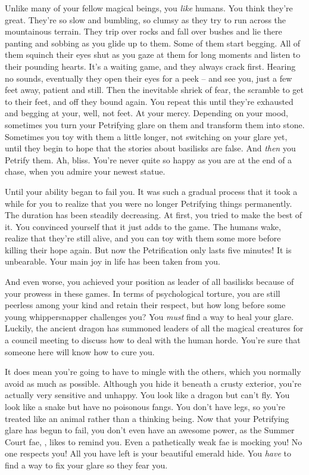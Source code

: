 \documentclass[char]{guildcamp2}
\begin{document}
\name{\cBasilisk{}}

Unlike many of your fellow magical beings, you \emph{like} humans.  You think they're great.  They're so slow and bumbling, so clumsy as they try to run across the mountainous terrain.  They trip over rocks and fall over bushes and lie there panting and sobbing as you glide up to them.  Some of them start begging.  All of them squinch their eyes shut as you gaze at them for long moments and listen to their pounding hearts.  It's a waiting game, and they always crack first.  Hearing no sounds, eventually they open their eyes for a peek -- and see you, just a few feet away, patient and still.  Then the inevitable shriek of fear, the scramble to get to their feet, and off they bound again.  You repeat this until they're exhausted and begging at your, well, not feet.  At your mercy.  Depending on your mood, sometimes you turn your Petrifying glare on them and transform them into stone.  Sometimes you toy with them a little longer, not switching on your glare yet, until they begin to hope that the stories about basilisks are false.  And \emph{then} you Petrify them.  Ah, bliss.  You're never quite so happy as you are at the end of a chase, when you admire your newest statue.

Until your ability began to fail you.  It was such a gradual process that it took a while for you to realize that you were no longer Petrifying things permanently.  The duration has been steadily decreasing.  At first, you tried to make the best of it.  You convinced yourself that it just adds to the game.  The humans wake, realize that they're still alive, and you can toy with them some more before killing their hope again.  But now the Petrification only lasts five minutes!  It is unbearable.  Your main joy in life has been taken from you.  

And even worse, you achieved your position as leader of all basilisks because of your prowess in these games.  In terms of psychological torture, you are still peerless among your kind and retain their respect, but how long before some young whippersnapper challenges you?  You \emph{must} find a way to heal your glare.  Luckily, the ancient dragon \cOnyx{\intro} has summoned leaders of all the magical creatures for a council meeting to discuss how to deal with the human horde.  You're sure that someone here will know how to cure you.

It does mean you're going to have to mingle with the others, which you normally avoid as much as possible.  Although you hide it beneath a crusty exterior, you're actually very sensitive and unhappy.  You look like a dragon but can't fly.  You look like a snake but have no poisonous fangs.  You don't have legs, so you're treated like an animal rather than a thinking being.  Now that your Petrifying glare has begun to fail, you don't even have an awesome power, as the Summer Court fae, \cTreeFae{\intro}, likes to remind you.  Even a pathetically weak fae is mocking you!  No one respects you!  All you have left is your beautiful emerald hide.  You \emph{have} to find a way to fix your glare so they fear you.
\end{document}
